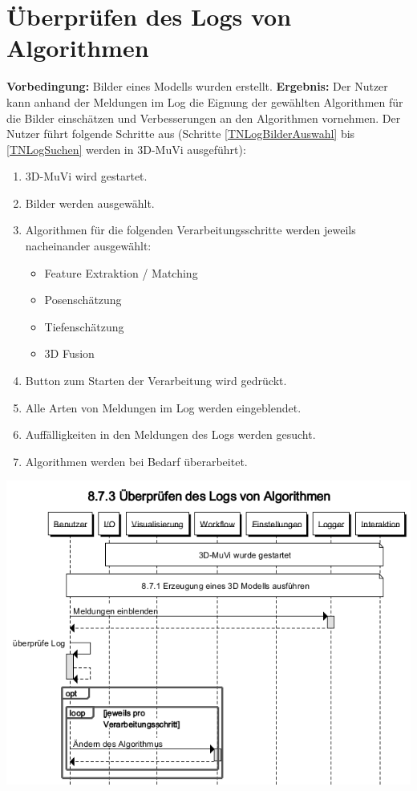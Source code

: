 \section{Überprüfen des Logs von Algorithmen}
\textbf{Vorbedingung:} Bilder eines Modells wurden erstellt. \newline
\textbf{Ergebnis:} Der Nutzer kann anhand der Meldungen im Log die Eignung der gewählten Algorithmen für die Bilder einschätzen und Verbesserungen an den Algorithmen vornehmen. \newline
Der Nutzer führt folgende Schritte aus (Schritte \ref{TNLogBilderAuswahl} bis \ref{TNLogSuchen} werden in 3D-MuVi ausgeführt):
\begin{enumerate}
	\item 3D-MuVi wird gestartet.
	\item \label{TNLogBilderAuswahl} Bilder werden ausgewählt.
	\item Algorithmen für die folgenden Verarbeitungsschritte werden jeweils nacheinander ausgewählt:
	\begin{itemize}
		\item Feature Extraktion / Matching
		\item Posenschätzung
		\item Tiefenschätzung
		\item 3D Fusion
	\end{itemize}
	\item Button zum Starten der Verarbeitung wird gedrückt.
	\item Alle Arten von Meldungen im Log werden eingeblendet.
	\item \label{TNLogSuchen} Auffälligkeiten in den Meldungen des Logs werden gesucht.
	\item Algorithmen werden bei Bedarf überarbeitet.
\end{enumerate}
\includegraphics[width=1.05\textwidth]{img/873_Seqz.png}

